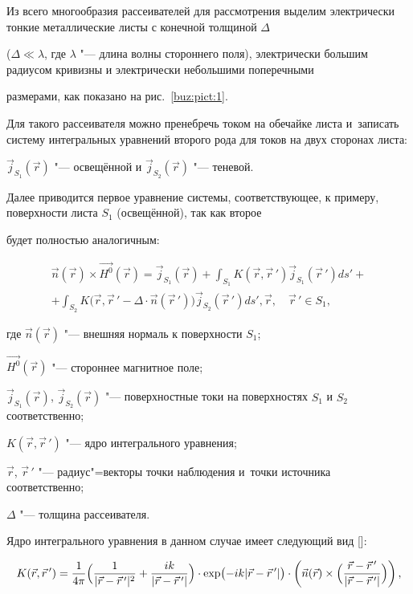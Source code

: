Из всего многообразия рассеивателей для рассмотрения выделим электрически тонкие металлические листы с конечной толщиной $\Delta$

($\Delta \ll \lambda$, где $\lambda$ "--- длина волны стороннего поля), электрически большим радиусом кривизны и электрически небольшими поперечными

размерами, как показано на рис.~\ref{buz:pict:1}. 

Для такого рассеивателя можно пренебречь током на обечайке листа и~записать систему интегральных уравнений второго рода для токов на двух сторонах листа: 

$\vec{j}_{S_1}(\vec{r})$ "--- освещённой и $\vec{j}_{S_2}(\vec{r})$ "--- теневой. 

Далее приводится первое уравнение системы, соответствующее, к примеру, поверхности листа $S_1$ (освещённой), так как второе

будет полностью аналогичным:

\begin{multline}

\label{buz:eq1}

\vec{n}(\vec{r})\times\vec{H^0}(\vec{r})=\vec{j}_{S_1}(\vec{r})+\int_{S_1}{K(\vec{r},\vec{r}\,')\vec{j}_{S_1}(\vec{r}\,')ds'}+ \\ +

\int_{S_2}{K\bigl(\vec{r},\vec{r}\,'-\Delta\cdot\vec{n}(\vec{r}\,')\bigr)\vec{j}_{S_2}(\vec{r}\,')ds'},

\vec{r}, \quad  \vec{r}\,'\in{S_1},

\end{multline}

где $\vec{n}(\vec{r})$ "--- внешняя нормаль к поверхности $S_1$;

    $\vec{H^0}(\vec{r})$ "--- стороннее магнитное поле;

    $\vec{j}_{S_1}(\vec{r})$, $\vec{j}_{S_2}(\vec{r})$ "--- поверхностные токи на поверхностях $S_1$ и $S_2$ соответственно;

    $K(\vec{r},\vec{r}\,')$ "--- ядро интегрального уравнения;

    $\vec{r}$, $\vec{r}\,'$ "--- радиус"=векторы точки наблюдения и~точки источника соответственно;

    $\Delta$ "--- толщина рассеивателя.



Ядро интегрального уравнения в данном случае имеет следующий вид []:

\begin{equation}

\label{buz:eq2} K(\vec{r},\vec{r}\,')=\frac1 {4\pi}\Bigl(\frac1

{|\vec{r}-\vec{r}\,'|^{2}}+\frac{ik}

{|\vec{r}-\vec{r}\,'|}\Bigr)\cdot\exp\bigl(-ik|\vec{r}-\vec{r}\,'|\bigr)\cdot\left(\vec{n}(\vec{r})\times\Bigl(\frac{\vec{r}-\vec{r}\,'}

{|\vec{r}-\vec{r}\,'|}\Bigr)\right),

\end{equation}

